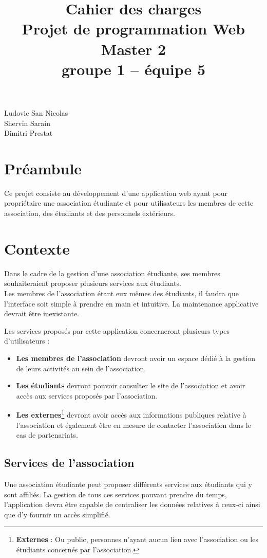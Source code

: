 \documentclass[a4paper,12pt]{article}
\title{Cahier des charges\\Projet de programmation Web\\Master 2\\groupe 1 -- équipe 5}
\begin{document}
\maketitle

\begin{flushright}
	\textsf{Ludovic San Nicolas\\Shervin Sarain\\Dimitri Prestat}
\end{flushright}

\section{Préambule}
	Ce projet consiste au développement d'une application web ayant pour propriétaire une association étudiante et pour utilisateurs les membres de cette association, des étudiants et des personnels extérieurs.

\section{Contexte}
	Dans le cadre de la gestion d'une association étudiante, ses membres souhaiteraient proposer plusieurs services aux étudiants.\\
Les membres de l'association étant eux mêmes des étudiants, il faudra que l'interface soit simple à prendre en main et intuitive. La maintenance applicative devrait être inexistante.
\par
	Les services proposés par cette application concerneront plusieurs types d'utilisateurs :
\begin{itemize}
	\item\textbf{Les membres de l'association} devront avoir un espace dédié à la gestion de leurs activités au sein de l'association.
	\item\textbf{Les étudiants} devront pouvoir consulter le site de l'association et avoir accès aux services proposés par l'association.
	\item\textbf{Les externes}\footnote{\textbf{Externes} : Ou public, personnes n'ayant aucun lien avec l'association ou les étudiants concernés par l'association.} devront avoir accès aux informations publiques relative à l'association et également être en mesure de contacter l'association dans le cas de partenariats. 
\end{itemize}

\subsection{Services de l'association}
	Une association étudiante peut proposer différents services aux étudiants qui y sont affiliés. La gestion de tous ces services pouvant prendre du temps, l'application devra être capable de centraliser les données relatives à ceux-ci ainsi que d'y fournir un accès simplifié.
	
\end{document}
